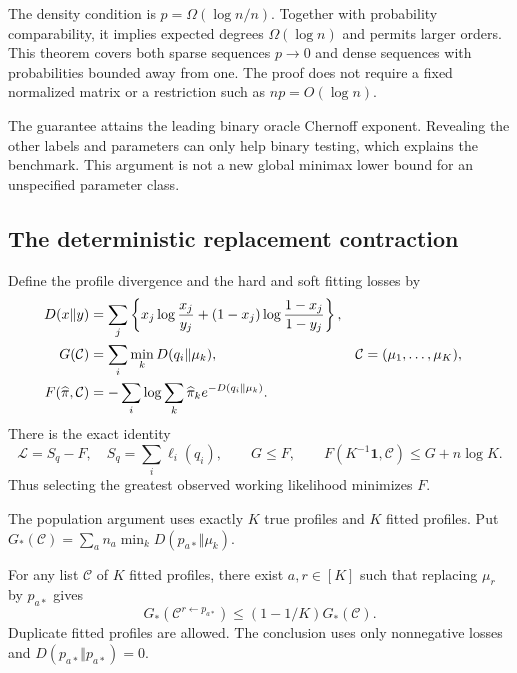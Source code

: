 The density condition is $p=\Omega(\log n/n)$. Together with probability comparability, it implies expected degrees $\Omega(\log n)$ and permits larger orders. This theorem covers both sparse sequences $p\to0$ and dense sequences with probabilities bounded away from one. The proof does not require a fixed normalized matrix or a restriction such as $np=O(\log n)$.

The guarantee attains the leading binary oracle Chernoff exponent. Revealing the other labels and parameters can only help binary testing, which explains the benchmark. This argument is not a new global minimax lower bound for an unspecified parameter class.

\subsection{The deterministic replacement contraction}
Define the profile divergence and the hard and soft fitting losses by
\begin{align}
 D(x\Vert y)&=\sum_j\left\{x_j\log\frac{x_j}{y_j}
                  +(1-x_j)\log\frac{1-x_j}{1-y_j}\right\},
 \label{eq:profile-divergence}\\
 G(\mathcal C)&=\sum_i\min_kD(q_i\Vert\mu_k),
 &\mathcal C&=(\mu_1,\ldots,\mu_K),\notag\\
 F(\widehat\pi,\mathcal C)
    &=-\sum_i\log\sum_k\widehat\pi_k e^{-D(q_i\Vert\mu_k)}.
 \label{eq:soft-loss}
\end{align}
There is the exact identity
\begin{equation}
 \mathcal L=S_q-F,\quad S_q=\sum_i\ell_i(q_i),\qquad
 G\le F,\qquad F(K^{-1}\mathbf1,\mathcal C)\le G+n\log K.
 \label{eq:soft-hard}
\end{equation}
Thus selecting the greatest observed working likelihood minimizes $F$.

The population argument uses exactly $K$ true profiles and $K$ fitted profiles. Put
$G_*(\mathcal C)=\sum_an_a\min_kD(p_{a*}\Vert\mu_k)$.

\begin{lemma}
\label{lem:population-replacement}
For any list $\mathcal C$ of $K$ fitted profiles, there exist $a,r\in[K]$ such that replacing $\mu_r$ by $p_{a*}$ gives
\begin{equation}
 G_*(\mathcal C^{r\leftarrow p_{a*}})
       \le(1-1/K)G_*(\mathcal C).
 \label{eq:population-contraction}
\end{equation}
Duplicate fitted profiles are allowed. The conclusion uses only nonnegative losses and $D(p_{a*}\Vert p_{a*})=0$.
\end{lemma}

